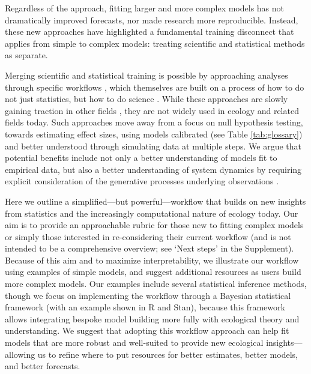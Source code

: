 \documentclass[11pt]{article}
\begin{document}
Regardless of the approach, fitting larger and more complex models has not dramatically improved forecasts, nor made research more reproducible. Instead, these new approaches have highlighted a fundamental training disconnect that applies from simple to complex models: treating scientific and statistical methods as separate.

Merging scientific and statistical training is possible by approaching analyses through specific workflows \citep{betanworkflow,grinsztajn2021,vandeschoot2021}, which themselves are built on a process of how to do not just statistics, but how to do science \citep{box1976science}. While these approaches are slowly gaining traction in other fields \citep[e.g.,][]{esfahani2021bayesian,schad2021,bouman2024bayesian}, they are not widely used in ecology and related fields today. Such approaches move away from a focus on null hypothesis testing, towards estimating effect sizes, using models calibrated (see Table \ref{tab:glossary}) and better understood through simulating data at multiple steps. We argue that potential benefits include not only a better understanding of models fit to empirical data, but also a better understanding of system dynamics by requiring explicit consideration of the generative processes underlying observations \citep{grace2025causal}. 

Here we outline a simplified---but powerful---workflow that builds on new insights from statistics  \citep{betanworkflow,gelman2020bayesian,vandeschoot2021} and the increasingly computational nature of ecology today. Our aim is to provide an approachable rubric for those new to fitting complex models or simply those interested in re-considering their current workflow (and is not intended to be a comprehensive overview; see `Next steps' in the Supplement). Because of this aim and to maximize interpretability, we illustrate our workflow using examples of simple models, and suggest additional resources as users build more complex models. Our examples include several statistical inference methods, though we focus on implementing the workflow through a Bayesian statistical framework (with an example shown in \textsf{R} and \textsf{Stan}), because this framework allows integrating bespoke model building more fully with ecological theory and understanding. We suggest that adopting this workflow approach can help fit models that are more robust and well-suited to provide new ecological insights---allowing us to refine where to put resources for better estimates, better models, and better forecasts.
\end{document}
